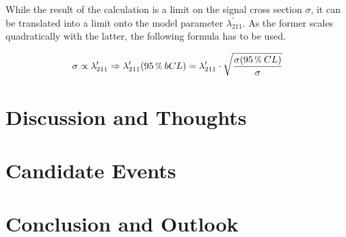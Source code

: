 While the result of the calculation is a limit on the signal cross section $\sigma$, it can be translated into a limit onto the model parameter $\lambda^\prime_{211}$. As the former scales quadratically with the latter, the following formula has to be used.


\begin{equation}
  \label{eq:xs-lambda-scale}
  \sigma \propto \lambda^\prime_{211} \Rightarrow \lambda^\prime_{211} (95\,\pct\:b CL) = \lambda^\prime_{211} \cdot \sqrt{ \frac{\sigma (95\,\pct\: CL)}{\sigma} } 
\end{equation}



\section{Discussion and Thoughts}
\label{sec:discussion}


\section{Candidate Events}
\label{sec:candidate-events}


\section{Conclusion and Outlook}
\label{sec:conclusion}




